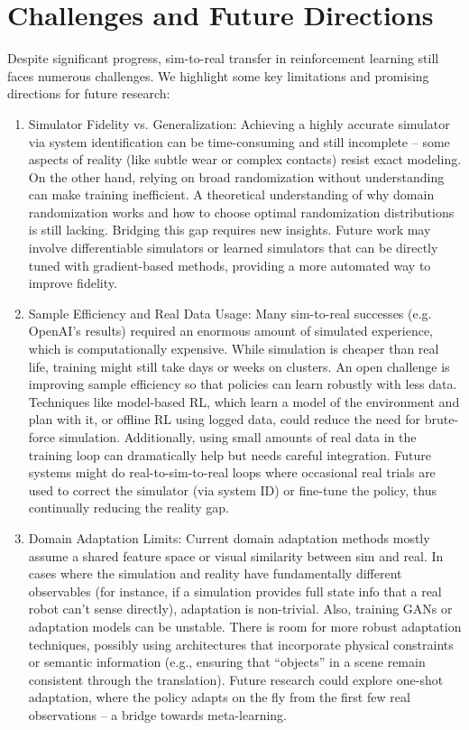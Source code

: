 \section{Challenges and Future Directions}
Despite significant progress, sim-to-real transfer in reinforcement learning still faces numerous challenges. We highlight some key limitations and promising directions for future research:

\begin{enumerate}
    \item Simulator Fidelity vs. Generalization: Achieving a highly accurate simulator via system identification can be time-consuming and still incomplete – some aspects of reality (like subtle wear or complex contacts) resist exact modeling. On the other hand, relying on broad randomization without understanding can make training inefficient. A theoretical understanding of why domain randomization works and how to choose optimal randomization distributions is still lacking. Bridging this gap requires new insights. Future work may involve differentiable simulators or learned simulators that can be directly tuned with gradient-based methods, providing a more automated way to improve fidelity.
    \item Sample Efficiency and Real Data Usage: Many sim-to-real successes (e.g. OpenAI’s results) required an enormous amount of simulated experience, which is computationally expensive. While simulation is cheaper than real life, training might still take days or weeks on clusters. An open challenge is improving sample efficiency so that policies can learn robustly with less data. Techniques like model-based RL, which learn a model of the environment and plan with it, or offline RL using logged data, could reduce the need for brute-force simulation. Additionally, using small amounts of real data in the training loop can dramatically help but needs careful integration. Future systems might do real-to-sim-to-real loops where occasional real trials are used to correct the simulator (via system ID) or fine-tune the policy, thus continually reducing the reality gap.
    \item Domain Adaptation Limits: Current domain adaptation methods mostly assume a shared feature space or visual similarity between sim and real. In cases where the simulation and reality have fundamentally different observables (for instance, if a simulation provides full state info that a real robot can’t sense directly), adaptation is non-trivial. Also, training GANs or adaptation models can be unstable. There is room for more robust adaptation techniques, possibly using architectures that incorporate physical constraints or semantic information (e.g., ensuring that “objects” in a scene remain consistent through the translation). Future research could explore one-shot adaptation, where the policy adapts on the fly from the first few real observations – a bridge towards meta-learning.

\end{enumerate}
